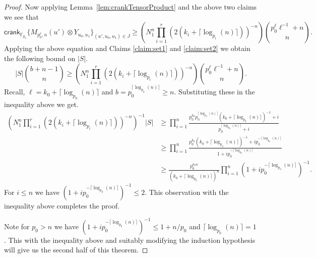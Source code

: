 \documentclass[11pt]{article}
\numberwithin{equation}{section}
\def\F{{\mathbb{F}}}
\def\crank{\textsf{crank}}
\begin{document}
\begin{proof}
Now applying Lemma~\ref{lem:crankTensorProduct} and the above two claims we see that
$$\crank_{\F_{p_0}} \{M_{p_0^{\ell},n}(u')\otimes Y_{u_0,u_1}\}_{(u',u_0,u_1)\in J}\ge \left(N_1^n\prod\limits_{i=1}^r (2(k_i+\lceil \log_{p_i}(n)\rceil))^{-n}\right)\binom{p_0^\ell \ell^{-1}+n}{n}. $$
Applying the above equation and Claims \ref{claim:set1} and \ref{claim:set2} we obtain the following bound on $|S|$.
$$|S|\binom{b+n-1}{n}\ge \left(N_1^n\prod\limits_{i=1}^r (2(k_i+\lceil \log_{p_i}(n)\rceil))^{-n}\right)\binom{p_0^\ell \ell^{-1}+n}{n}.$$
Recall, $\ell=k_0+\lceil \log_{p_0}(n)\rceil$ and $b=p_0^{\lceil \log_{p_0}(n)\rceil}\ge n$. Substituting these in the inequality above we get.
\begin{align*}
    \left(N_1^n\prod\limits_{i=1}^r (2(k_i+\lceil \log_{p_i}(n)\rceil))^{-n}\right)^{-1}|S|  &\ge  \prod\limits_{i=1}^n \frac{p_0^{k_0} p_0^{\lceil \log_{p_0}(n)\rceil} (k_0+\lceil \log_{p_0}(n)\rceil)^{-1} +i}{p_0^{\lceil \log_{p_0}(n)\rceil} +i}\\
    &\ge \prod\limits_{i=1}^n \frac{ p_0^{k_0}(k_0+\lceil \log_{p_0}(n)\rceil)^{-1} +i p_0^{-\lceil \log_{p_0}(n)\rceil}}{1+i  p_0^{-\lceil \log_{p_0}(n)\rceil}}\\
    &\ge \frac{p_0^{k_0n}}{(k_0+\lceil \log_{p_0}(n)\rceil)^{n}} \prod\limits_{i=1}^n\left(1+i p_0^{-\lceil \log_{p_0}(n)\rceil} \right)^{-1}.
\end{align*}
For $i\le n$ we have $\left(1+i p_0^{-\lceil \log_{p_0}(n)\rceil} \right)^{-1}\le 2$. This observation with the inequality above completes the proof.

Note for $p_0>n$ we have $\left(1+i p_0^{-\lceil \log_{p_0}(n)\rceil} \right)^{-1}\le 1+n/p_0$ and $\lceil\log_{p_0}(n)\rceil=1$. This with the inequality above and suitably modifying the induction hypothesis will give us the second half of this theorem.
\end{proof}
\end{document}
